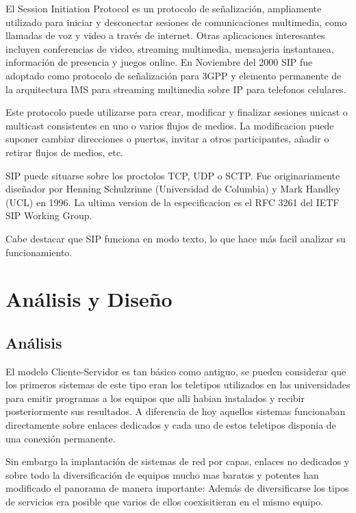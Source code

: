 \documentclass[a4paper,spanish,12pt]{book}
\begin{document}
El Session Initiation Protocol es un protocolo de señalización, ampliamente utilizado para iniciar y desconectar sesiones de comunicaciones multimedia, como llamadas de voz y video a trav\'es de internet. Otras aplicaciones interesantes incluyen conferencias de video, streaming multimedia, mensajeria instantanea, información de presencia y juegos online. En Noviembre del 2000 SIP fue adoptado como protocolo de señalización para 3GPP y elemento permanente de la arquitectura IMS para streaming multimedia sobre IP para telefonos celulares.

Este protocolo puede utilizarse para crear, modificar y finalizar sesiones unicast o multicast consistentes en uno o varios flujos de medios. La modificacion puede suponer cambiar direcciones o puertos, invitar a otros participantes, añadir o retirar flujos de medios, etc.

SIP puede situarse sobre los proctolos TCP, UDP o SCTP. Fue originariamente diseñador por Henning Schulzrinne (Universidad de Columbia) y Mark Handley (UCL) en 1996. La ultima version de la especificacion es el \cite{RFCSIP} RFC 3261 del IETF SIP Working Group.

Cabe destacar que SIP funciona en modo texto, lo que hace más facil analizar su funcionamiento.

\chapter{Análisis y Diseño}
\section{Análisis}
El modelo Cliente-Servidor es tan básico como antiguo, se pueden considerar que los primeros sistemas de este tipo eran los teletipos utilizados en las universidades para emitir programas a los equipos que alli habian instalados y recibir posteriormente sus resultados. A diferencia de hoy aquellos sistemas funcionaban directamente sobre enlaces dedicados y cada uno de estos teletipos disponia de una conexión permanente.

Sin embargo la implantación de sistemas de red por capas, enlaces no dedicados y sobre todo la diversificación de equipos mucho mas baratos y potentes han modificado el panorama de manera importante: Además de diversificarse los tipos de servicios era posible que varios de ellos coexisitieran en el mismo equipo.
\end{document}
